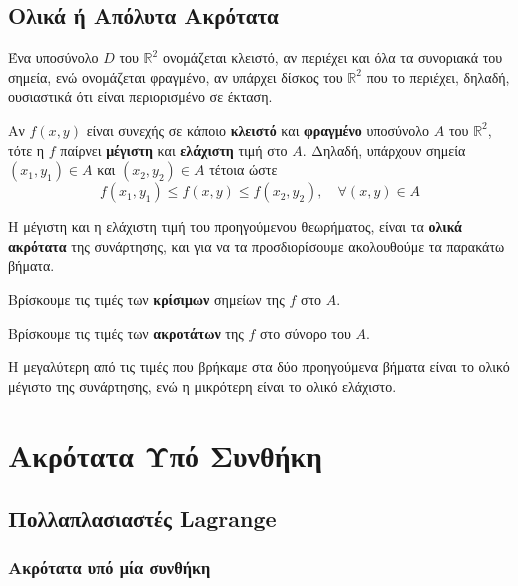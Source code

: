 \documentclass[a4paper,table]{report} 
\begin{document}
\section{Ολικά ή Απόλυτα Ακρότατα}

Ένα υποσύνολο $D$ του $ \mathbb{R}^{2} $ ονομάζεται \textcolor{Col1}{κλειστό}, αν 
περιέχει και όλα τα συνοριακά του σημεία, ενώ ονομάζεται \textcolor{Col1}{φραγμένο}, αν 
υπάρχει δίσκος του $ \mathbb{R}^{2} $ που το περιέχει, δηλαδή, ουσιαστικά ότι είναι 
περιορισμένο σε έκταση.

\begin{thm}
  Αν $f(x,y)$ είναι συνεχής σε κάποιο \textbf{κλειστό} και \textbf{φραγμένο} υποσύνολο 
  $A$ του $ \mathbb{R}^{2} $, τότε η $f$ παίρνει \textbf{μέγιστη} και \textbf{ελάχιστη} 
  τιμή στο $A$.  Δηλαδή, υπάρχουν σημεία $ (x_{1}, y_{1}) \in A $ και $ (x_{2}, y_{2}) 
  \in A $ τέτοια ώστε 
  \[
    f(x_{1}, y_{1}) \leq f(x,y) \leq f(x_{2}, y_{2}), \quad \forall (x,y) \in A
  \]
\end{thm}

Η μέγιστη και η ελάχιστη τιμή του προηγούμενου θεωρήματος, είναι τα \textbf{ολικά
ακρότατα} της συνάρτησης, και για να τα προσδιορίσουμε ακολουθούμε τα παρακάτω βήματα.

\begin{myitemize}
  \item Βρίσκουμε τις τιμές των \textbf{κρίσιμων} σημείων της $f$ στο $A$.
  \item Βρίσκουμε τις τιμές των \textbf{ακροτάτων} της $f$ στο σύνορο του $A$. 
  \item Η μεγαλύτερη από τις τιμές που βρήκαμε στα δύο προηγούμενα βήματα 
    είναι το ολικό μέγιστο της συνάρτησης, ενώ η μικρότερη είναι το ολικό ελάχιστο.
\end{myitemize}






\chapter{Ακρότατα Υπό Συνθήκη}

\section{Πολλαπλασιαστές Lagrange}

\subsection{Ακρότατα υπό μία συνθήκη}
\end{document}
